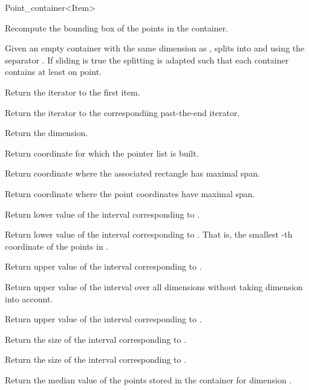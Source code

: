 \begin{ccRefClass}{Point_container<Item>}
\begin{ccAdvanced}
{Recompute the bounding box of the points in the container.}

{Given an empty container  with the same dimension as , splits  into
 and  using the separator . If sliding is true the splitting is adapted
such that each container contains at least on point.}

{
Return the iterator to the first item.
}

{
Return the iterator to the correspondiing past-the-end iterator.
}

{
Return the dimension.
}

{
Return coordinate for which the pointer list is built.
}

{
Return coordinate where the associated rectangle has maximal span.
}

{
Return coordinate where the point coordinates have maximal span.
}

{
Return lower value of the interval corresponding to
.
}


{
Return lower value of the interval corresponding to
. That is, the smallest
-th coordinate of the points in
.
}


{
Return upper value of the interval corresponding to
.
}

{
Return upper value of the interval over all dimensions
without taking dimension  into account.
}

{
Return upper value of the interval corresponding to
.
}

{
Return the size of the interval corresponding to .
}

{
Return the size of the interval corresponding to .
}

{
Return the median value of the points stored in the container for
dimension .
}


\end{ccAdvanced}
\end{ccRefClass}
